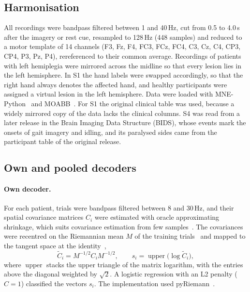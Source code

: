 \documentclass[pdflatex,sn-mathphys-num]{sn-jnl}
\begin{document}
\subsection{Harmonisation}\label{sec:harmon}

All recordings were bandpass filtered between 1 and 40\,Hz, cut from 0.5 to 4.0\,s after the imagery or rest cue, resampled to 128\,Hz (448 samples) and reduced to a motor template of 14 channels (F3, Fz, F4, FC3, FCz, FC4, C3, Cz, C4, CP3, CP4, P3, Pz, P4), rereferenced to their common average. Recordings of patients with left hemiplegia were mirrored across the midline so that every lesion lies in the left hemisphere. In S1 the hand labels were swapped accordingly, so that the right hand always denotes the affected hand, and healthy participants were assigned a virtual lesion in the left hemisphere. Data were loaded with MNE-Python~\cite{gramfort2013} and MOABB~\cite{jayaram2018}. For S1 the original clinical table was used, because a widely mirrored copy of the data lacks the clinical columns. S4 was read from a later release in the Brain Imaging Data Structure (BIDS), whose events mark the onsets of gait imagery and idling, and its paralysed sides came from the participant table of the original release.

\subsection{Own and pooled decoders}\label{sec:decoders}

\paragraph{Own decoder.} For each patient, trials were bandpass filtered between 8 and 30\,Hz, and their spatial covariance matrices $C_i$ were estimated with oracle approximating shrinkage, which suits covariance estimation from few samples~\cite{chen2010}. The covariances were recentred on the Riemannian mean $M$ of the training trials~\cite{zanini2018} and mapped to the tangent space at the identity~\cite{barachant2012},
\begin{equation}
\tilde C_i = M^{-1/2} C_i M^{-1/2}, \qquad s_i = \operatorname{upper}\bigl(\log \tilde C_i\bigr),\label{eq:tangent}
\end{equation}
where $\operatorname{upper}$ stacks the upper triangle of the matrix logarithm, with the entries above the diagonal weighted by $\sqrt{2}$. A logistic regression with an L2 penalty ($C = 1$) classified the vectors $s_i$. The implementation used pyRiemann~\cite{pyriemann}.
\end{document}
